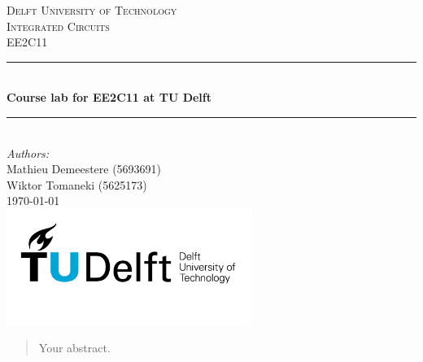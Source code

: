 \documentclass[a4paper]{report}
\begin{document}
\begin{titlepage}

\newcommand{\HRule}{\rule{\linewidth}{0.5mm}} 							%
\center 
 
\textsc{\LARGE Delft University of Technology}\\[1cm]

\textsc{\Large Integrated Circuits}\\[0.2cm]
\textsc{\large EE2C11}\\[1cm] 										%
\HRule \\[0.8cm]
{ \huge \bfseries Course lab for EE2C11 at TU Delft}\\[0.7cm]								%
\HRule \\[2cm]
\large
\emph{Authors:}\\
Mathieu Demeestere (5693691)\\
Wiktor Tomaneki (5625173)\\[1.5cm]
{\large \today}\\[5cm]
\includegraphics[width=0.6\textwidth]{images/TU_delft_logo.jpg}\\[1cm] 	%
\vfill 
\end{titlepage}

\begin{abstract}
Your abstract.
\end{abstract}













\end{document}
